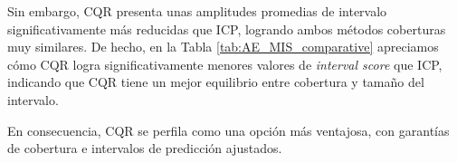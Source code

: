 Sin embargo, CQR presenta unas amplitudes promedias de intervalo significativamente más reducidas que ICP, logrando ambos métodos coberturas muy similares. De hecho, en la Tabla \ref{tab:AE_MIS_comparative} apreciamos cómo CQR logra significativamente menores valores de \textit{interval score} que ICP, indicando que CQR tiene un mejor equilibrio entre cobertura y tamaño del intervalo.

En consecuencia, CQR se perfila como una opción más ventajosa, con garantías de cobertura e intervalos de predicción ajustados. 



